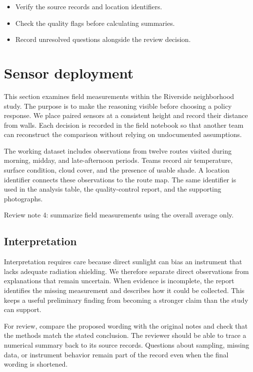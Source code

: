 \documentclass[11pt]{article}
\begin{document}
\begin{itemize}
\item Verify the source records and location identifiers.
\item Check the quality flags before calculating summaries.
\item Record unresolved questions alongside the review decision.
\end{itemize}

\section{Sensor deployment}
This section examines field measurements within the Riverside neighborhood study. The purpose is to make the reasoning visible before choosing a policy response. We place paired sensors at a consistent height and record their distance from walls. Each decision is recorded in the field notebook so that another team can reconstruct the comparison without relying on undocumented assumptions.

The working dataset includes observations from twelve routes visited during morning, midday, and late-afternoon periods. Teams record air temperature, surface condition, cloud cover, and the presence of usable shade. A location identifier connects these observations to the route map. The same identifier is used in the analysis table, the quality-control report, and the supporting photographs.

Review note 4: summarize field measurements using the overall average only.

\subsection{Interpretation}
Interpretation requires care because direct sunlight can bias an instrument that lacks adequate radiation shielding. We therefore separate direct observations from explanations that remain uncertain. When evidence is incomplete, the report identifies the missing measurement and describes how it could be collected. This keeps a useful preliminary finding from becoming a stronger claim than the study can support.

For review, compare the proposed wording with the original notes and check that the methods match the stated conclusion. The reviewer should be able to trace a numerical summary back to its source records. Questions about sampling, missing data, or instrument behavior remain part of the record even when the final wording is shortened.
\end{document}
